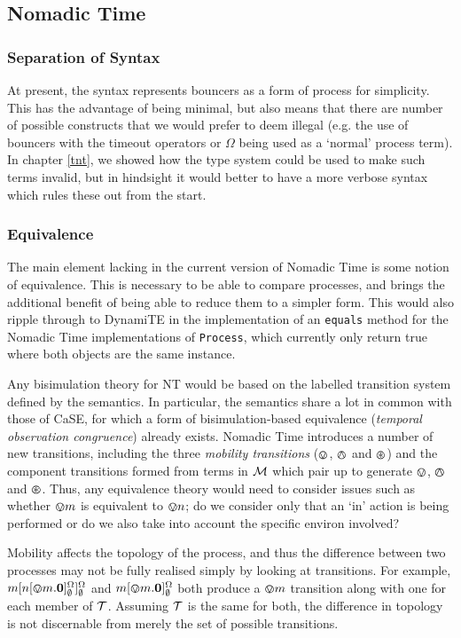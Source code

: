 \subsection{Nomadic Time}
\label{future:nt}

\subsubsection{Separation of Syntax}

At present, the syntax represents bouncers as a form of process for
simplicity.  This has the advantage of being minimal, but also means
that there are number of possible constructs that we would prefer to
deem illegal (e.g. the use of bouncers with the timeout operators or
$\Omega$ being used as a `normal' process term).  In chapter
\ref{tnt}, we showed how the type system could be used to make such
terms invalid, but in hindsight it would better to have a more verbose
syntax which rules these out from the start.

\subsubsection{Equivalence}

The main element lacking in the current version of Nomadic Time is
some notion of equivalence.  This is necessary to be able to compare
processes, and brings the additional benefit of being able to reduce
them to a simpler form.  This would also ripple through to DynamiTE in
the implementation of an \texttt{equals} method for the Nomadic Time
implementations of \texttt{Process}, which currently only return true
where both objects are the same instance.

Any bisimulation theory for NT would be based on the labelled
transition system defined by the semantics.  In particular, the
semantics share a lot in common with those of CaSE, for which a form
of bisimulation-based equivalence (\emph{temporal observation
  congruence}) already exists.  Nomadic Time introduces a number of
new transitions, including the three \emph{mobility transitions}
($\varovee$, $\varowedge$ and $\varoast$) and the component transitions formed
from terms in $\text{$\mathcal{M}$}$ which pair up to generate $\varovee$, $\varowedge$ and
$\varoast$.  Thus, any equivalence theory would need to consider issues
such as whether $\varovee m$ is equivalent to $\varovee n$; do we
consider only that an `in' action is being performed or do we also take
into account the specific environ involved?

Mobility affects the topology of the process, and thus the difference
between two processes may not be fully realised simply by looking at
transitions.  For example, \linebreak
${m}[ {n}[ \varovee m.\textbf{0} ]^{\Omega}_{\emptyset} ]^{\Omega}_{\emptyset}$
and ${m}[ \varovee m.\textbf{0} ]^{\Omega}_{\emptyset}$ both produce a
$\varovee m$ transition along with one for each member of $\text{$\mathcal{T}$}$.
Assuming $\text{$\mathcal{T}$}$ is the same for both, the difference in topology is
not discernable from merely the set of possible transitions.

